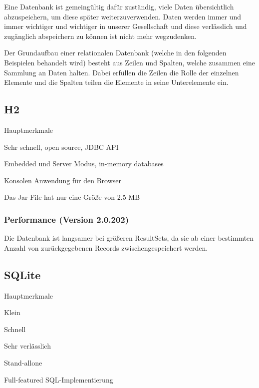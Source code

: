 
Eine Datenbank ist gemeingültig dafür zuständig, viele Daten übersichtlich abzuspeichern, um diese später weiterzuverwenden. Daten werden immer und immer wichtiger und wichtiger in unserer Gesellschaft und diese verlässlich und zugänglich abspeichern zu können ist nicht mehr wegzudenken.
 
Der Grundaufbau einer relationalen Datenbank (welche in den folgenden Beispielen behandelt wird) besteht aus Zeilen und Spalten, welche zusammen eine Sammlung an Daten halten. Dabei erfüllen die Zeilen die Rolle der einzelnen Elemente und die Spalten teilen die Elemente in seine Unterelemente ein. \cite{javaInselBuch}
 
 
\subsection{H2}

\begin{compactitem}
    \item[Hauptmerkmale]
    \item Sehr schnell, open source, JDBC API
    \item Embedded und Server Modus, in-memory databases        
    \item Konsolen Anwendung für den Browser
    \item Das Jar-File hat nur eine Größe von 2.5 MB
\end{compactitem} 
\cite{databaseComparison}


\subsubsection{Performance (Version 2.0.202)}
Die Datenbank ist langsamer bei größeren ResultSets, da sie ab einer bestimmten Anzahl von zurückgegebenen Records zwischengespeichert werden. \cite{databaseComparison}


 
\subsection{SQLite}

\begin{compactitem}
    \item [Hauptmerkmale]
    \item Klein
    \item Schnell        
    \item Sehr verlässlich
    \item Stand-allone
    \item Full-featured SQL-Implementierung
\end{compactitem} 
\cite{sqlliteOfficialSite}

